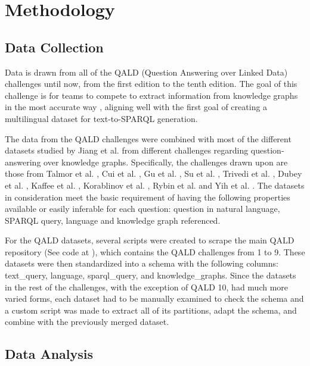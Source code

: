 \section{Methodology}\label{section::methodology}

\subsection{Data Collection}\label{section::data_collection}

Data is drawn from all of the QALD (Question Answering over Linked Data) challenges until now, from the first edition to the tenth edition. The goal of this challenge is for teams to compete to extract information from knowledge graphs in the most accurate way \cite{LOPEZ20133}, aligning well with the first goal of creating a multilingual dataset for text-to-SPARQL generation.

The data from the QALD challenges were combined with most of the different datasets studied by Jiang et al. \cite{jiang2022knowledge} from different challenges regarding question-answering over knowledge graphs. Specifically, the challenges drawn upon are those from Talmor et al. \cite{Talmor2018TheWA}, Cui et al. \cite{2021arXiv210803509C}, Gu et al. \cite{gu2021beyond}, Su et al. \cite{su-etal-2016-generating}, Trivedi et al. \cite{trivedi2017lc}, Dubey et al. \cite{dubey2017lc2}, Kaffee et al. \cite{DBLP:conf/kcap/KaffeeESV19}, Korablinov et al. \cite{2020arXiv200510659K}, Rybin et al. \cite{rybin2021rubq} and Yih et al. \cite{yih-etal-2016-value}. The datasets in consideration meet the basic requirement of having the following properties available or easily inferable for each question: question in natural language, SPARQL query, language and knowledge graph referenced.

For the QALD datasets, several scripts were created to scrape the main QALD repository (See code at \cite{QALDRepo}), which contains the QALD challenges from 1 to 9. These datasets were then standardized into a schema with the following columns: text\_query, language, sparql\_query, and knowledge\_graphs.
Since the datasets in the rest of the challenges, with the exception of QALD 10, had much more varied forms, each dataset had to be manually examined to check the schema and a custom script was made to extract all of its partitions, adapt the schema, and combine with the previously merged dataset.

\subsection{Data Analysis}

